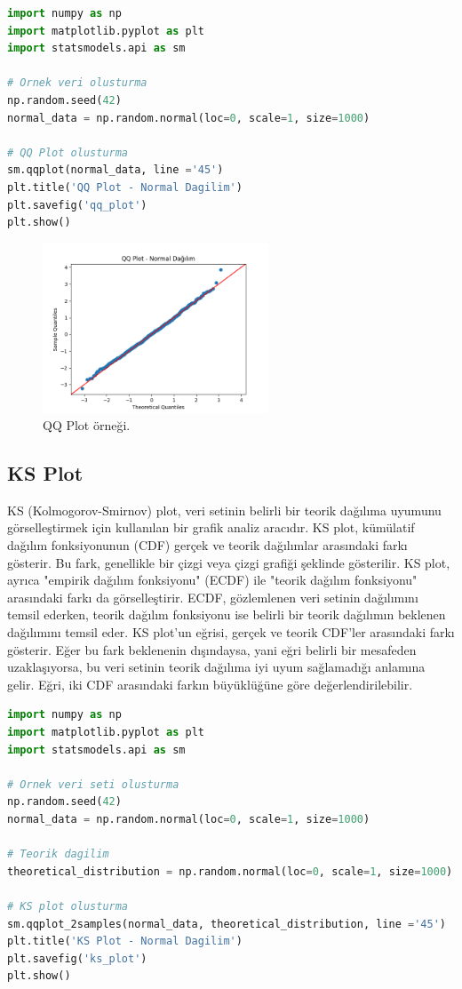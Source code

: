 \begin{lstlisting}[language=Python]
import numpy as np
import matplotlib.pyplot as plt
import statsmodels.api as sm

# Ornek veri olusturma
np.random.seed(42)
normal_data = np.random.normal(loc=0, scale=1, size=1000)

# QQ Plot olusturma
sm.qqplot(normal_data, line ='45')
plt.title('QQ Plot - Normal Dagilim')
plt.savefig('qq_plot')
plt.show()
\end{lstlisting}

\begin{figure}[h]
    \centering
    \includegraphics[width=0.6\textwidth]{images/qq_plot.png}
    \caption{QQ Plot örneği.}
    \label{fig:enter-label}
\end{figure}

\newpage

\subsection{KS Plot}
KS (Kolmogorov-Smirnov) plot, veri setinin belirli bir teorik dağılıma uyumunu görselleştirmek için kullanılan bir grafik analiz aracıdır. KS plot, kümülatif dağılım fonksiyonunun (CDF) gerçek ve teorik dağılımlar arasındaki farkı gösterir. Bu fark, genellikle bir çizgi veya çizgi grafiği şeklinde gösterilir. KS plot, ayrıca "empirik dağılım fonksiyonu" (ECDF) ile "teorik dağılım fonksiyonu" arasındaki farkı da görselleştirir. ECDF, gözlemlenen veri setinin dağılımını temsil ederken, teorik dağılım fonksiyonu ise belirli bir teorik dağılımın beklenen dağılımını temsil eder. KS plot'un eğrisi, gerçek ve teorik CDF'ler arasındaki farkı gösterir. Eğer bu fark beklenenin dışındaysa, yani eğri belirli bir mesafeden uzaklaşıyorsa, bu veri setinin teorik dağılıma iyi uyum sağlamadığı anlamına gelir. Eğri, iki CDF arasındaki farkın büyüklüğüne göre değerlendirilebilir.

\begin{lstlisting}[language=Python]
import numpy as np
import matplotlib.pyplot as plt
import statsmodels.api as sm

# Ornek veri seti olusturma
np.random.seed(42)
normal_data = np.random.normal(loc=0, scale=1, size=1000)

# Teorik dagilim
theoretical_distribution = np.random.normal(loc=0, scale=1, size=1000)

# KS plot olusturma
sm.qqplot_2samples(normal_data, theoretical_distribution, line ='45')
plt.title('KS Plot - Normal Dagilim')
plt.savefig('ks_plot')
plt.show()
\end{lstlisting}

